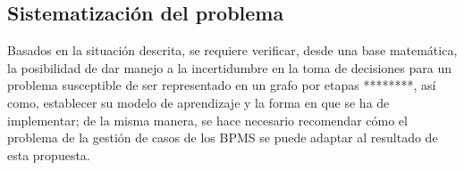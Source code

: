 



\subsection{Sistematización del problema}

Basados en la situación descrita, se requiere verificar, desde una base matemática, la posibilidad de dar manejo a la incertidumbre en la toma de decisiones para un problema susceptible de ser representado en un grafo por etapas ********, así como, establecer su modelo de aprendizaje y la forma en que se ha de implementar; de la misma manera, se hace necesario recomendar cómo el problema de la gestión de casos de los BPMS se puede adaptar al resultado de esta propuesta. 

